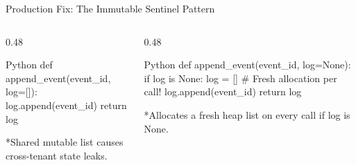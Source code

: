 \begin{frame}[fragile]{Production Fix: The Immutable Sentinel Pattern}
  \begin{columns}[T,onlytextwidth]
    \begin{column}{0.48\textwidth}
      \begin{tcolorbox}[enhanced,arc=1.2mm,boxrule=.4pt,colback=UpGradRed!8,colframe=UpGradRed,title={\bfseries\scriptsize Anti-Pattern (State Leak Hazard)},coltitle=white]
        \begin{CodeBlock}{Python}
def append_event(event_id, log=[]):
    log.append(event_id)
    return log
        \end{CodeBlock}
        \vspace{0.02cm}
        {\tiny\color{UpGradRedDark}*Shared mutable list causes cross-tenant state leaks.}
      \end{tcolorbox}
    \end{column}
    \begin{column}{0.48\textwidth}
      \begin{tcolorbox}[enhanced,arc=1.2mm,boxrule=.4pt,colback=AWSEmerald!8,colframe=AWSEmerald,title={\bfseries\scriptsize Production Pattern (Defensive Sentinel)},coltitle=white]
        \begin{CodeBlock}{Python}
def append_event(event_id, log=None):
    if log is None:
        log = [] # Fresh allocation per call!
    log.append(event_id)
    return log
        \end{CodeBlock}
        \vspace{0.02cm}
        {\tiny\color{AWSEmerald}*Allocates a fresh heap list on every call if log is None.}
      \end{tcolorbox}
    \end{column}
  \end{columns}
  \vspace{0.18cm}
\end{frame}

